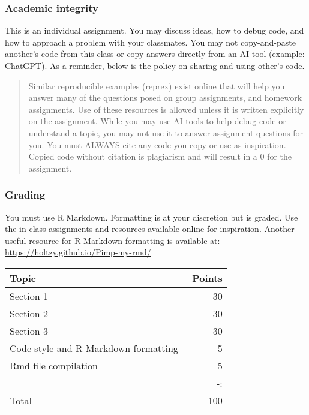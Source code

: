 \documentclass[
]{article}
\begin{document}
\subsubsection{Academic integrity}\label{academic-integrity}

This is an individual assignment. You may discuss ideas, how to debug
code, and how to approach a problem with your classmates. You may not
copy-and-paste another's code from this class or copy answers directly
from an AI tool (example: ChatGPT). As a reminder, below is the policy
on sharing and using other's code.

\begin{quote}
Similar reproducible examples (reprex) exist online that will help you
answer many of the questions posed on group assignments, and homework
assignments. Use of these resources is allowed unless it is written
explicitly on the assignment. While you may use AI tools to help debug
code or understand a topic, you may not use it to answer assignment
questions for you. You must ALWAYS cite any code you copy or use as
inspiration. Copied code without citation is plagiarism and will result
in a 0 for the assignment.
\end{quote}

\subsubsection{Grading}\label{grading}

You must use R Markdown. Formatting is at your discretion but is graded.
Use the in-class assignments and resources available online for
inspiration. Another useful resource for R Markdown formatting is
available at: \url{https://holtzy.github.io/Pimp-my-rmd/}

\begin{longtable}[]{@{}lr@{}}
\toprule\noalign{}
\textbf{Topic} & \textbf{Points} \\
\midrule\noalign{}
\endhead
\bottomrule\noalign{}
\endlastfoot
Section 1 & 30 \\
Section 2 & 30 \\
Section 3 & 30 \\
Code style and R Markdown formatting & 5 \\
Rmd file compilation & 5 \\
--------- & ----------: \\
Total & 100 \\
\end{longtable}
\end{document}

